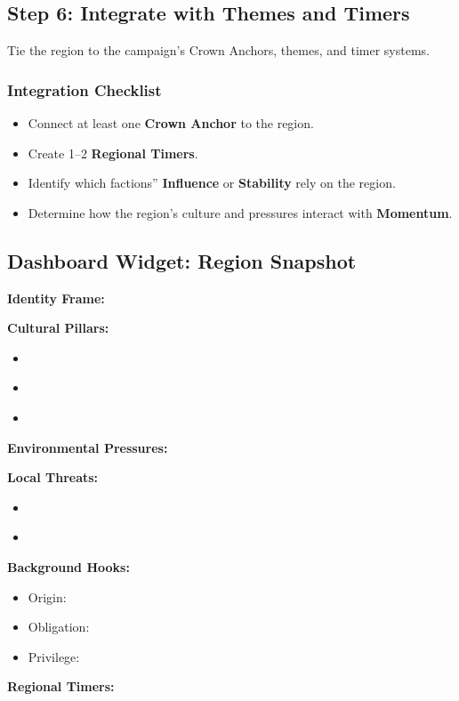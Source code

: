 \documentclass[11pt]{article}
\begin{document}
\subsection{Step 6: Integrate with Themes and Timers}

Tie the region to the campaign's Crown Anchors, themes, and timer systems.

\subsubsection{Integration Checklist}
\begin{itemize}
    \item Connect at least one \textbf{Crown Anchor} to the region.
    \item Create 1--2 \textbf{Regional Timers}.
    \item Identify which factions'' \textbf{Influence} or \textbf{Stability} rely on the region.
    \item Determine how the region's culture and pressures interact with \textbf{Momentum}.
\end{itemize}

\subsection{Dashboard Widget: Region Snapshot}

\begin{tcolorbox}[
  title=\textbf{Region Snapshot (Quick Reference)},
  colback=gray!10,
  colframe=black,
  fonttitle=\bfseries,
  left=6pt,
  right=6pt,
  top=6pt,
  bottom=6pt,
  enhanced,
  sharp corners
,breakable]

\textbf{Identity Frame:} \underline{\phantom{XXXXXXXXXXXX}}

\textbf{Cultural Pillars:}
\begin{itemize}[leftmargin=1.2em]
  \item \underline{\phantom{Pillar}}
  \item \underline{\phantom{Pillar}}
  \item \underline{\phantom{Pillar}}
\end{itemize}

\textbf{Environmental Pressures:} \underline{\phantom{XXXXXX}}

\textbf{Local Threats:}
\begin{itemize}[leftmargin=1.2em]
  \item \underline{\phantom{Threat}}
  \item \underline{\phantom{Threat}}
\end{itemize}

\textbf{Background Hooks:}
\begin{itemize}[leftmargin=1.2em]
  \item Origin: \underline{\phantom{XXXXX}}
  \item Obligation: \underline{\phantom{XXXXX}}
  \item Privilege: \underline{\phantom{XXXXX}}
\end{itemize}

\textbf{Regional Timers:} \underline{\phantom{XXXXXX}}

\end{tcolorbox}
\end{document}

